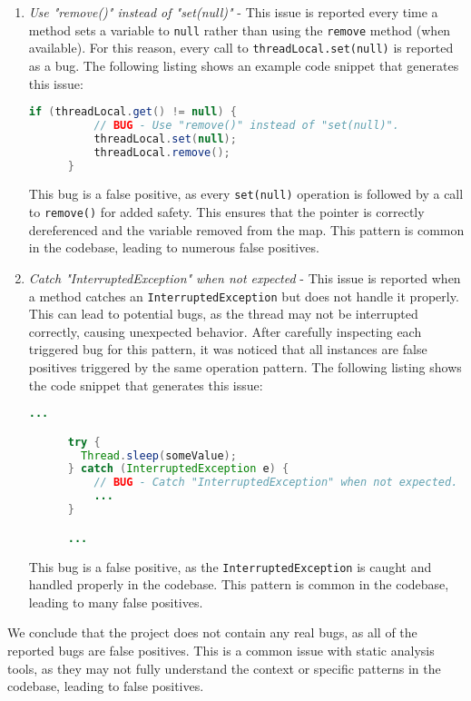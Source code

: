 \begin{enumerate}
  \item \textit{Use "remove()" instead of "set(null)"} - This issue is reported every time a method sets a variable to \texttt{null} rather than using the \texttt{remove} method (when available). For this reason, every call to \texttt{threadLocal.set(null)} is reported as a bug. The following listing shows an example code snippet that generates this issue:

    \begin{lstlisting}[language=Java]
      if (threadLocal.get() != null) {
          // BUG - Use "remove()" instead of "set(null)".
          threadLocal.set(null);
          threadLocal.remove();
      }
    \end{lstlisting}

    \noindent This bug is a false positive, as every \texttt{set(null)} operation is followed by a call to \texttt{remove()} for added safety. This ensures that the pointer is correctly dereferenced and the variable removed from the map. This pattern is common in the codebase, leading to numerous false positives.

  \item \textit{Catch "InterruptedException" when not expected} - This issue is reported when a method catches an \texttt{InterruptedException} but does not handle it properly. This can lead to potential bugs, as the thread may not be interrupted correctly, causing unexpected behavior. After carefully inspecting each triggered bug for this pattern, it was noticed that all instances are false positives triggered by the same operation pattern. The following listing shows the code snippet that generates this issue:
    \begin{lstlisting}[language=Java]
      ...

      try {
        Thread.sleep(someValue);
      } catch (InterruptedException e) {
          // BUG - Catch "InterruptedException" when not expected.
          ...
      }

      ...
    \end{lstlisting}
    \noindent This bug is a false positive, as the \texttt{InterruptedException} is caught and handled properly in the codebase. This pattern is common in the codebase, leading to many false positives.
\end{enumerate}

\noindent We conclude that the project does not contain any real bugs, as all of the reported bugs are false positives. This is a common issue with static analysis tools, as they may not fully understand the context or specific patterns in the codebase, leading to false positives.

